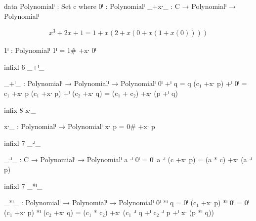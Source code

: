 \documentclass[./Thesis.tex]{subfiles}
\begin{document}
\begin{AgdaAlign}
  \begin{code}
  data Polynomialⁱ : Set c where
    0ⁱ    : Polynomialⁱ
    _+x∙_ : C → Polynomialⁱ → Polynomialⁱ
  \end{code}
  \begin{align*}
    x^3 + 2x + 1 = 1 + x\left( 2 + x\left( 0 + x\left( 1 + x\left( 0 \right) \right) \right) \right)
  \end{align*}
  \begin{code}
  1ⁱ : Polynomialⁱ
  1ⁱ = 1# +x∙ 0ⁱ
  \end{code}
  \begin{code}[hide]
  infixl 6 _+ⁱ_
  \end{code}
  \begin{code}
  _+ⁱ_ : Polynomialⁱ → Polynomialⁱ → Polynomialⁱ
  0ⁱ +ⁱ q = q
  (c₁ +x∙ p) +ⁱ 0ⁱ = c₁ +x∙ p
  (c₁ +x∙ p) +ⁱ (c₂ +x∙ q) = (c₁ + c₂) +x∙ (p +ⁱ q)
  \end{code}
  \begin{code}[hide]
  infix 8 x∙_
  \end{code}
  \begin{code}
  x∙_ : Polynomialⁱ → Polynomialⁱ
  x∙ p = 0# +x∙ p
  \end{code}
  \begin{code}[hide]
  infixl 7 _∙ⁱ_
  \end{code}
  \begin{code}
  _∙ⁱ_ : C → Polynomialⁱ → Polynomialⁱ
  a ∙ⁱ 0ⁱ = 0ⁱ
  a ∙ⁱ (c +x∙ p) = (a * c) +x∙ (a ∙ⁱ p)
  \end{code}
  \begin{code}[hide]
  infixl 7 _*ⁱ_
  \end{code}
  \begin{code}
  _*ⁱ_ : Polynomialⁱ → Polynomialⁱ → Polynomialⁱ
  0ⁱ *ⁱ q = 0ⁱ
  (c₁ +x∙ p) *ⁱ 0ⁱ = 0ⁱ
  (c₁ +x∙ p) *ⁱ (c₂ +x∙ q) = (c₁ * c₂) +x∙ (c₁ ∙ⁱ q +ⁱ c₂ ∙ⁱ p +ⁱ x∙ (p *ⁱ q))
  \end{code}
\end{AgdaAlign}
\end{document}
